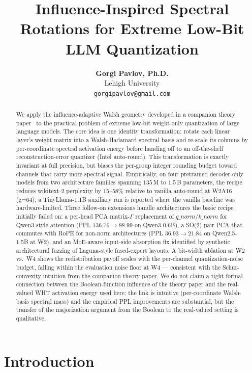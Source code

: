 \documentclass[11pt]{article}
\title{Influence-Inspired Spectral Rotations for Extreme Low-Bit\\LLM Quantization}
\author{
  \textbf{Gorgi Pavlov, Ph.D.} \\
  Lehigh University \\
  \texttt{gorgipavlov@gmail.com}
}
\begin{document}
\maketitle

\begin{abstract}
We apply the influence-adaptive Walsh geometry developed in a companion theory paper~\cite{bbtTheoryCompanion} to the practical problem of extreme low-bit weight-only quantization of large language models. The core idea is one identity transformation: rotate each linear layer's weight matrix into a Walsh-Hadamard spectral basis and re-scale its columns by per-coordinate spectral activation energy before handing off to an off-the-shelf reconstruction-error quantizer (Intel auto-round). This transformation is exactly invariant at full precision, but biases the per-group integer rounding budget toward channels that carry more spectral signal. Empirically, on four pretrained decoder-only models from two architecture families spanning $135\,$M to $1.5\,$B parameters, the recipe reduces wikitext-2 perplexity by $15$--$58\%$ relative to vanilla auto-round at W2A16 (g=64); a TinyLlama-1.1B auxiliary run is reported where the vanilla baseline was hardware-limited. Three follow-on extensions handle architectures the basic recipe initially failed on: a per-head PCA matrix-$\Gamma$ replacement of $q\_norm$/$k\_norm$ for Qwen3-style attention (PPL $136.76 \to 88.99$ on Qwen3-0.6B), a SO(2)-pair PCA that commutes with RoPE for non-norm architectures (PPL $36.93 \to 21.84$ on Qwen2.5-1.5B at W2), and an MoE-aware input-side absorption fix identified by synthetic architectural fuzzing of Laguna-style fused-expert layouts. A bit-width ablation at W2 vs.\ W4 shows the redistribution payoff scales with the per-channel quantization-noise budget, falling within the evaluation noise floor at W4 --- consistent with the Schur-convexity intuition from the companion theory paper. We do not claim a tight formal connection between the Boolean-function influence of the theory paper and the real-valued WHT activation energy used here; the link is intuitive (per-coordinate Walsh-basis spectral mass) and the empirical PPL improvements are substantial, but the transfer of the majorization argument from the Boolean to the real-valued setting is qualitative.
\end{abstract}

\section{Introduction}
\end{document}
